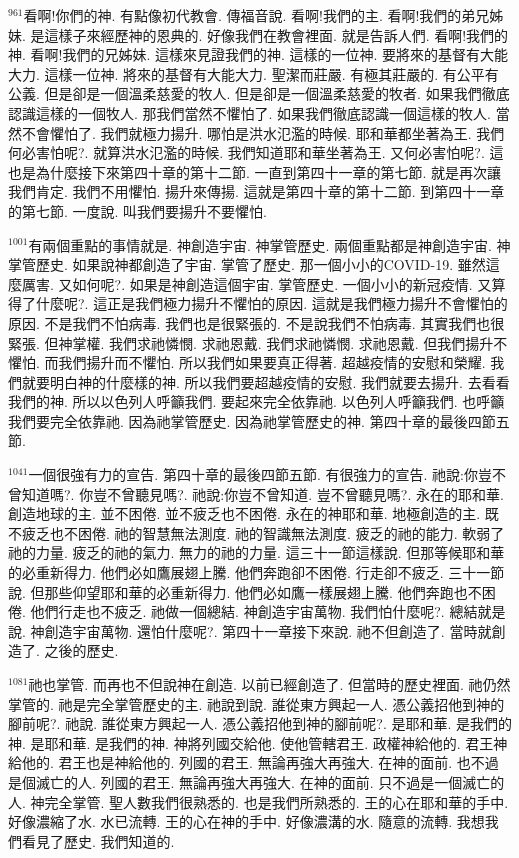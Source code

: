 \documentclass{book}
\begin{document}
$^{961}$看啊!你們的神.
有點像初代教會.
傳福音說.
看啊!我們的主.
看啊!我們的弟兄姊妹.
是這樣子來經歷神的恩典的.
好像我們在教會裡面.
就是告訴人們.
看啊!我們的神.
看啊!我們的兄姊妹.
這樣來見證我們的神.
這樣的一位神.
要將來的基督有大能大力.
這樣一位神.
將來的基督有大能大力.
聖潔而莊嚴.
有極其莊嚴的.
有公平有公義.
但是卻是一個溫柔慈愛的牧人.
但是卻是一個溫柔慈愛的牧者.
如果我們徹底認識這樣的一個牧人.
那我們當然不懼怕了.
如果我們徹底認識一個這樣的牧人.
當然不會懼怕了.
我們就極力揚升.
哪怕是洪水氾濫的時候.
耶和華都坐著為王.
我們何必害怕呢?.
就算洪水氾濫的時候.
我們知道耶和華坐著為王.
又何必害怕呢?.
這也是為什麼接下來第四十章的第十二節.
一直到第四十一章的第七節.
就是再次讓我們肯定.
我們不用懼怕.
揚升來傳揚.
這就是第四十章的第十二節.
到第四十一章的第七節.
一度說.
叫我們要揚升不要懼怕.

$^{1001}$有兩個重點的事情就是.
神創造宇宙.
神掌管歷史.
兩個重點都是神創造宇宙.
神掌管歷史.
如果說神都創造了宇宙.
掌管了歷史.
那一個小小的COVID-19.
雖然這麼厲害.
又如何呢?.
如果是神創造這個宇宙.
掌管歷史.
一個小小的新冠疫情.
又算得了什麼呢?.
這正是我們極力揚升不懼怕的原因.
這就是我們極力揚升不會懼怕的原因.
不是我們不怕病毒.
我們也是很緊張的.
不是說我們不怕病毒.
其實我們也很緊張.
但神掌權.
我們求祂憐憫.
求祂恩戴.
我們求祂憐憫.
求祂恩戴.
但我們揚升不懼怕.
而我們揚升而不懼怕.
所以我們如果要真正得著.
超越疫情的安慰和榮耀.
我們就要明白神的什麼樣的神.
所以我們要超越疫情的安慰.
我們就要去揚升.
去看看我們的神.
所以以色列人呼籲我們.
要起來完全依靠祂.
以色列人呼籲我們.
也呼籲我們要完全依靠祂.
因為祂掌管歷史.
因為祂掌管歷史的神.
第四十章的最後四節五節.

$^{1041}$一個很強有力的宣告.
第四十章的最後四節五節.
有很強力的宣告.
祂說:你豈不曾知道嗎?.
你豈不曾聽見嗎?.
祂說:你豈不曾知道.
豈不曾聽見嗎?.
永在的耶和華.
創造地球的主.
並不困倦.
並不疲乏也不困倦.
永在的神耶和華.
地極創造的主.
既不疲乏也不困倦.
祂的智慧無法測度.
祂的智識無法測度.
疲乏的祂的能力.
軟弱了祂的力量.
疲乏的祂的氣力.
無力的祂的力量.
這三十一節這樣說.
但那等候耶和華的必重新得力.
他們必如鷹展翅上騰.
他們奔跑卻不困倦.
行走卻不疲乏.
三十一節說.
但那些仰望耶和華的必重新得力.
他們必如鷹一樣展翅上騰.
他們奔跑也不困倦.
他們行走也不疲乏.
祂做一個總結.
神創造宇宙萬物.
我們怕什麼呢?.
總結就是說.
神創造宇宙萬物.
還怕什麼呢?.
第四十一章接下來說.
祂不但創造了.
當時就創造了.
之後的歷史.

$^{1081}$祂也掌管.
而再也不但說神在創造.
以前已經創造了.
但當時的歷史裡面.
祂仍然掌管的.
祂是完全掌管歷史的主.
祂說到說.
誰從東方興起一人.
憑公義招他到神的腳前呢?.
祂說.
誰從東方興起一人.
憑公義招他到神的腳前呢?.
是耶和華.
是我們的神.
是耶和華.
是我們的神.
神將列國交給他.
使他管轄君王.
政權神給他的.
君王神給他的.
君王也是神給他的.
列國的君王.
無論再強大再強大.
在神的面前.
也不過是個滅亡的人.
列國的君王.
無論再強大再強大.
在神的面前.
只不過是一個滅亡的人.
神完全掌管.
聖人數我們很熟悉的.
也是我們所熟悉的.
王的心在耶和華的手中.
好像濃縮了水.
水已流轉.
王的心在神的手中.
好像濃溝的水.
隨意的流轉.
我想我們看見了歷史.
我們知道的.
\end{document}
